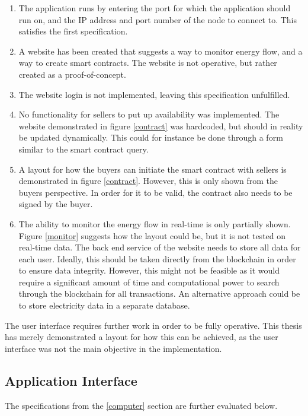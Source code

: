 \begin{enumerate}
\item The application runs by entering the port for which the application should run on, and the IP address and port number of the node to connect to. This satisfies the first specification.
\item A website has been created that suggests a way to monitor energy flow, and a way to create smart contracts. The website is not operative, but rather created as a proof-of-concept.
\item The website login is not implemented, leaving this specification unfulfilled. 
\item No functionality for sellers to put up availability was implemented. The website demonstrated in figure \ref{contract} was hardcoded, but should in reality be updated dynamically. This could for instance be done through a form similar to the smart contract query.  
\item A layout for how the buyers can initiate the smart contract with sellers is demonstrated in figure \ref{contract}. However, this is only shown from the buyers perspective. In order for it to be valid, the contract also needs to be signed by the buyer.
\item The ability to monitor the energy flow in real-time is only partially shown. Figure \ref{monitor} suggests how the layout could be, but it is not tested on real-time data. The back end service of the website needs to store all data for each user. Ideally, this should be taken directly from the blockchain in order to ensure data integrity. However, this might not be feasible as it would require a significant amount of time and computational power to search through the blockchain for all transactions. An alternative approach could be to store electricity data in a separate database.
\end{enumerate}

The user interface requires further work in order to be fully operative. This thesis has merely demonstrated a layout for how this can be achieved, as the user interface was not the main objective in the implementation.

\subsection*{Application Interface}
The specifications from the \ref{computer} section are further evaluated below.

